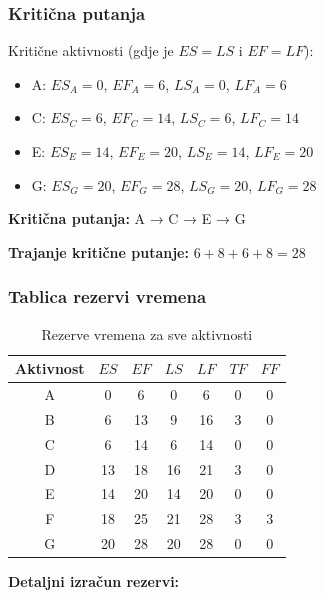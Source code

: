\documentclass[12pt,a4paper]{article}
\begin{document}
\subsubsection{Kritična putanja}

Kritične aktivnosti (gdje je $ES = LS$ i $EF = LF$):
\begin{itemize}
\item A: $ES_A = 0$, $EF_A = 6$, $LS_A = 0$, $LF_A = 6$ 
\item C: $ES_C = 6$, $EF_C = 14$, $LS_C = 6$, $LF_C = 14$ 
\item E: $ES_E = 14$, $EF_E = 20$, $LS_E = 14$, $LF_E = 20$ 
\item G: $ES_G = 20$, $EF_G = 28$, $LS_G = 20$, $LF_G = 28$ 
\end{itemize}

\textbf{Kritična putanja:} A → C → E → G

\textbf{Trajanje kritične putanje:} $6 + 8 + 6 + 8 = 28$

\subsubsection{Tablica rezervi vremena}

\begin{table}[h]
\centering
\small
\begin{tabular}{ccccccc}
\toprule
Aktivnost & $ES$ & $EF$ & $LS$ & $LF$ & $TF$ & $FF$ \\
\midrule
A & 0 & 6 & 0 & 6 & 0 & 0 \\
B & 6 & 13 & 9 & 16 & 3 & 0 \\
C & 6 & 14 & 6 & 14 & 0 & 0 \\
D & 13 & 18 & 16 & 21 & 3 & 0 \\
E & 14 & 20 & 14 & 20 & 0 & 0 \\
F & 18 & 25 & 21 & 28 & 3 & 3 \\
G & 20 & 28 & 20 & 28 & 0 & 0 \\
\bottomrule
\end{tabular}
\caption{Rezerve vremena za sve aktivnosti}
\end{table}

\textbf{Detaljni izračun rezervi:}
\end{document}
